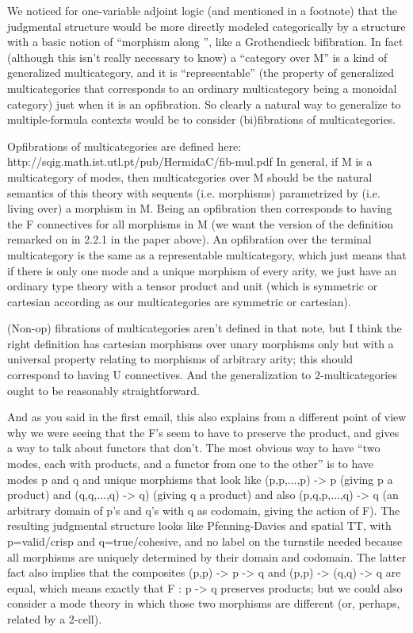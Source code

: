 We noticed for one-variable adjoint logic (and mentioned in a footnote)
that the judgmental structure would be more directly modeled
categorically by a structure with a basic notion of ``morphism along
\alpha'', like a Grothendieck bifibration.  In fact (although this isn't
really necessary to know) a ``category over M'' is a kind of generalized
multicategory, and it is ``representable'' (the property of generalized
multicategories that corresponds to an ordinary multicategory being a
monoidal category) just when it is an opfibration.  So clearly a natural
way to generalize to multiple-formula contexts would be to consider
(bi)fibrations of multicategories.

Opfibrations of multicategories are defined here:
http://sqig.math.ist.utl.pt/pub/HermidaC/fib-mul.pdf
In general, if M is a multicategory of modes, then multicategories over
M should be the natural semantics of this theory with sequents
(i.e. morphisms) parametrized by (i.e. living over) a morphism in M.
Being an opfibration then corresponds to having the F connectives for
all morphisms in M (we want the version of the definition remarked on in
2.2.1 in the paper above).  An opfibration over the terminal
multicategory is the same as a representable multicategory, which just
means that if there is only one mode and a unique morphism of every
arity, we just have an ordinary type theory with a tensor product and
unit (which is symmetric or cartesian according as our multicategories
are symmetric or cartesian).

(Non-op) fibrations of multicategories aren't defined in that note, but
I think the right definition has cartesian morphisms over unary
morphisms only but with a universal property relating to morphisms of
arbitrary arity; this should correspond to having U connectives.  And
the generalization to 2-multicategories ought to be reasonably
straightforward.

And as you said in the first email, this also explains from a different
point of view why we were seeing that the F's seem to have to preserve
the product, and gives a way to talk about functors that don't.  The
most obvious way to have ``two modes, each with products, and a functor
from one to the other'' is to have modes p and q and unique morphisms
that look like (p,p,...,p) -> p (giving p a product) and (q,q,...,q) ->
q) (giving q a product) and also (p,q,p,...,q) -> q (an arbitrary domain
of p's and q's with q as codomain, giving the action of F).  The
resulting judgmental structure looks like Pfenning-Davies and spatial
TT, with p=valid/crisp and q=true/cohesive, and no label on the
turnstile needed because all morphisms are uniquely determined by their
domain and codomain.  The latter fact also implies that the composites
(p,p) -> p -> q   and    (p,p) -> (q,q) -> q
are equal, which means exactly that F : p -> q preserves products; but
we could also consider a mode theory in which those two morphisms are
different (or, perhaps, related by a 2-cell).
